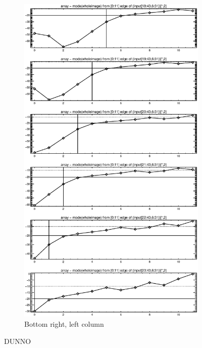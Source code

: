 \documentclass[10pt]{article}
\begin{document}
\begin{figure}[!h]
    \begin{subfigure}[b]{.4\linewidth}
        \centering
        \includegraphics[width=1.4\textwidth]{../plots_tables_images/botright3.eps} 
        \caption{Bottom right, left column}
    \end{subfigure}
    \caption{DUNNO}
\end{figure}
%
%
%
%
\end{document}
